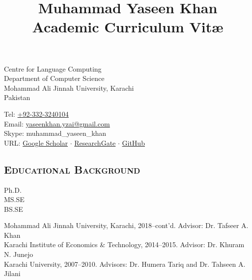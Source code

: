\documentclass[a4paper, 10pt]{article}
\title{Muhammad Yaseen Khan\\\small Academic Curriculum Vit\ae}
\author{}
\date{}
\begin{document}
\maketitle
\vspace{-3em}
\begin{minipage}{0.45\textwidth}
Centre for Language Computing\\
Department of Computer Science\\
Mohammad Ali Jinnah University, Karachi\\
Pakistan
\end{minipage}
\hfill
\begin{minipage}{0.45\textwidth}
Tel: \href{tel:+923323240104}{+92-332-3240104}\\
Email: \href{mailto:yaseenkhan.yzai@gmail.com}{yaseenkhan.yzai@gmail.com}\\
Skype: muhammad\_yaseen\_khan\\
URL: \href{https://scholar.google.com/citations?user=a_d2KTEAAAAJ&hl=en}{Google Scholar} $\cdot$ \href{https://www.researchgate.net/profile/Muhammad_Yaseen_Khan}{ResearchGate} $\cdot$ \href{https://www.github.com/MuhammadYaseenKhan}{GitHub}
\end{minipage}


\subsection*{\normalfont\textsc{\bf Educational Background}}
\hfill\begin{minipage}{0.09\textwidth}
Ph.D.\\
MS.SE\\
BS.SE
\end{minipage}%
\begin{minipage}{0.89\textwidth}
Mohammad Ali Jinnah University, Karachi, 2018--cont'd. Advisor: Dr. Tafseer A. Khan\\
Karachi Institute of Economics \& Technology, 2014--2015. Advisor: Dr. Khuram N. Junejo\\
Karachi University, 2007--2010. Advisors: Dr. Humera Tariq and Dr. Tahseen A. Jilani
\end{minipage}

\end{document}
